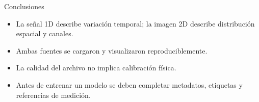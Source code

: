 \documentclass[aspectratio=169]{beamer}
\begin{document}
\begin{frame}{Conclusiones}
\begin{itemize}
\item La señal 1D describe variación temporal; la imagen 2D describe
distribución espacial y canales.
\item Ambas fuentes se cargaron y visualizaron reproduciblemente.
\item La calidad del archivo no implica calibración física.
\item Antes de entrenar un modelo se deben completar metadatos, etiquetas y
referencias de medición.
\end{itemize}
\end{frame}
\end{document}
